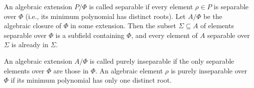 An algebraic extension $P/\Phi$ is called separable if every element $\rho \in P$ is separable over $\Phi$ (i.e., its minimum polynomial has distinct roots). Let $A/\Phi$ be the algebraic closure of $\Phi$ in some extension. Then the subset $\Sigma \subseteq A$ of elements separable over $\Phi$ is a subfield containing $\Phi$, and every element of $A$ separable over $\Sigma$ is already in $\Sigma$.

An algebraic extension $A/\Phi$ is called purely inseparable if the only separable elements over $\Phi$ are those in $\Phi$. An algebraic element $\rho$ is purely inseparable over $\Phi$ if its minimum polynomial has only one distinct root.
